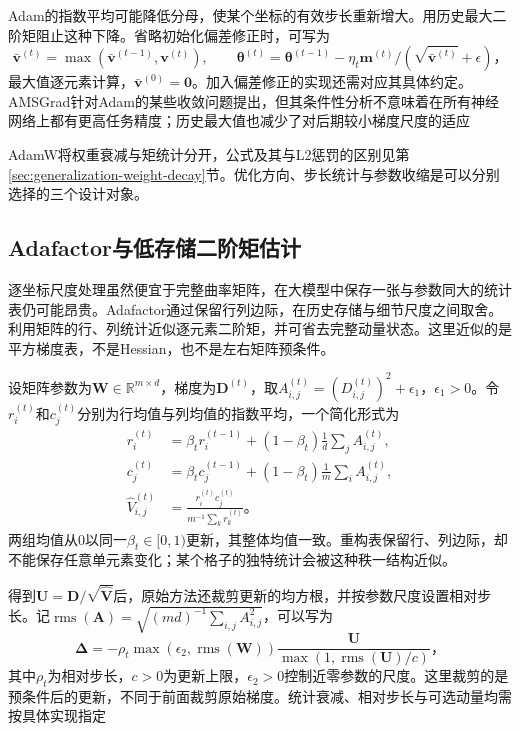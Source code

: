 Adam的指数平均可能降低分母，使某个坐标的有效步长重新增大。用历史最大二阶矩阻止这种下降。省略初始化偏差修正时，可写为
\begin{equation}
  \bar{\bm v}^{(t)}=\max(\bar{\bm v}^{(t-1)},\bm v^{(t)}),\qquad
  \bm\theta^{(t)}=\bm\theta^{(t-1)}-
    \eta_t\bm m^{(t)}/(\sqrt{\bar{\bm v}^{(t)}}+\epsilon)\text{，}
  \label{eq:training-amsgrad}
\end{equation}
最大值逐元素计算，$\bar{\bm v}^{(0)}=\bm0$。加入偏差修正的实现还需对应其具体约定。AMSGrad针对Adam的某些收敛问题提出，但其条件性分析不意味着在所有神经网络上都有更高任务精度；历史最大值也减少了对后期较小梯度尺度的适应

AdamW将权重衰减与矩统计分开，公式及其与L2惩罚的区别见第\ref{sec:generalization-weight-decay}节。优化方向、步长统计与参数收缩是可以分别选择的三个设计对象。

\subsection{Adafactor与低存储二阶矩估计}
\label{sec:training-adafactor}

逐坐标尺度处理虽然便宜于完整曲率矩阵，在大模型中保存一张与参数同大的统计表仍可能昂贵。Adafactor通过保留行列边际，在历史存储与细节尺度之间取舍。利用矩阵的行、列统计近似逐元素二阶矩，并可省去完整动量状态。这里近似的是平方梯度表，不是Hessian，也不是左右矩阵预条件。

设矩阵参数为$\bm W\in\mathbb R^{m\times d}$，梯度为$\bm D^{(t)}$，取$A_{i,j}^{(t)}=(D_{i,j}^{(t)})^2+\epsilon_1$，$\epsilon_1>0$。令$r_i^{(t)}$和$c_j^{(t)}$分别为行均值与列均值的指数平均，一个简化形式为
\begin{align}
  r_i^{(t)}&=\beta_t r_i^{(t-1)}+(1-\beta_t)\frac1d\sum_j A_{i,j}^{(t)},\\
  c_j^{(t)}&=\beta_t c_j^{(t-1)}+(1-\beta_t)\frac1m\sum_i A_{i,j}^{(t)},\\
  \hat V_{i,j}^{(t)}&=\frac{r_i^{(t)}c_j^{(t)}}{m^{-1}\sum_k r_k^{(t)}}\text{。}
  \label{eq:training-adafactor-factorization}
\end{align}
两组均值从0以同一$\beta_t\in[0,1)$更新，其整体均值一致。重构表保留行、列边际，却不能保存任意单元素变化；某个格子的独特统计会被这种秩一结构近似。

得到$\bm U=\bm D/\sqrt{\hat{\bm V}}$后，原始方法还裁剪更新的均方根，并按参数尺度设置相对步长。记$\operatorname{rms}(\bm A)=\sqrt{(md)^{-1}\sum_{i,j}A_{i,j}^2}$，可以写为
\begin{equation}
  \bm\Delta=-\rho_t\max(\epsilon_2,\operatorname{rms}(\bm W))
    \frac{\bm U}{\max(1,\operatorname{rms}(\bm U)/c)}\text{，}
  \label{eq:training-adafactor-update}
\end{equation}
其中$\rho_t$为相对步长，$c>0$为更新上限，$\epsilon_2>0$控制近零参数的尺度。这里裁剪的是预条件后的更新，不同于前面裁剪原始梯度。统计衰减、相对步长与可选动量均需按具体实现指定

